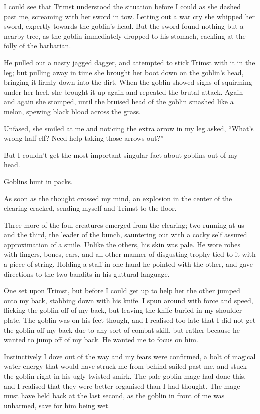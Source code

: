 \documentclass[12pt, a4paper]{book}
\begin{document}
I could see that Trimst understood the situation before I could as she dashed past me, screaming with her sword in tow. Letting out a war cry she whipped her sword, expertly towards the goblin's head. But the sword found nothing but a nearby tree, as the goblin immediately dropped to his stomach, cackling at the folly of the barbarian.

He pulled out a nasty jagged dagger, and attempted to stick Trimst with it in the leg; but pulling away in time she brought her boot down on the goblin's head, bringing it firmly down into the dirt. When the goblin showed signs of squirming under her heel, she brought it up again and repeated the brutal attack. Again and again she stomped, until the bruised head of the goblin smashed like a melon, spewing black blood across the grass.

Unfased, she smiled at me and noticing the extra arrow in my leg asked, ``What's wrong half elf? Need help taking those arrows out?''

But I couldn't get the most important singular fact about goblins out of my head.

Goblins hunt in packs.

As soon as the thought crossed my mind, an explosion in the center of the clearing cracked, sending myself and Trimst to the floor.

Three more of the foul creatures emerged from the clearing; two running at us and the third, the leader of the bunch, sauntering out with a cocky self assured approximation of a smile. Unlike the others, his skin was pale. He wore robes with fingers, bones, ears, and all other manner of disgusting trophy tied to it with a piece of string. Holding a staff in one hand he pointed with the other, and gave directions to the two bandits in his guttural language. 

One set upon Trimst, but before I could get up to help her the other jumped onto my back, stabbing down with his knife. I spun around with force and speed, flicking the goblin off of my back, but leaving the knife buried in my shoulder plate. The goblin was on his feet though, and I realised too late that I did not get the goblin off my back due to any sort of combat skill, but rather because he wanted to jump off of my back. He wanted me to focus on him. 

Instinctively I dove out of the way and my fears were confirmed, a bolt of magical water energy that would have struck me from behind sailed past me, and stuck the goblin right in his ugly twisted smirk. The pale goblin mage had done this, and I realised that they were better organised than I had thought. The mage must have held back at the last second, as the goblin in front of me was unharmed, save for him being wet.
\end{document}
